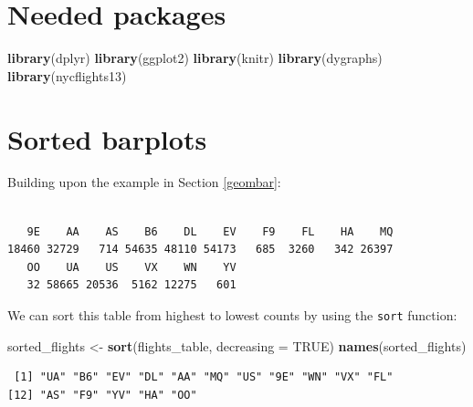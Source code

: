 \documentclass[12pt, krantz2,]{krantz}
\makeatletter
\newenvironment{Shaded}{\begin{snugshade}}{\end{snugshade}}
\newcommand{\DataTypeTok}[1]{\textcolor[rgb]{0.27,0.27,0.27}{#1}}
\newcommand{\KeywordTok}[1]{\textcolor[rgb]{0.27,0.27,0.27}{\textbf{#1}}}
\newcommand{\NormalTok}[1]{#1}
\newcommand{\OperatorTok}[1]{\textcolor[rgb]{0.43,0.43,0.43}{\textbf{#1}}}
\newcommand{\OtherTok}[1]{\textcolor[rgb]{0.37,0.37,0.37}{#1}}
\newcommand{\StringTok}[1]{\textcolor[rgb]{0.5,0.5,0.5}{#1}}
\newenvironment{kframe}{%
\medskip{}
\setlength{\fboxsep}{.8em}
 \def\at@end@of@kframe{}%
 \ifinner\ifhmode%
  \def\at@end@of@kframe{\end{minipage}}%
  \begin{minipage}{\columnwidth}%
 \fi\fi%
 \def\FrameCommand##1{\hskip\@totalleftmargin \hskip-\fboxsep
 \colorbox{shadecolor}{##1}\hskip-\fboxsep
     \hskip-\linewidth \hskip-\@totalleftmargin \hskip\columnwidth}%
 \MakeFramed {\advance\hsize-\width
   \@totalleftmargin\z@ \linewidth\hsize
   \@setminipage}}%
 {\par\unskip\endMakeFramed%
 \at@end@of@kframe}
\renewenvironment{Shaded}{\begin{kframe}}{\end{kframe}}
\makeatother
\begin{document}
\hypertarget{needed-packages-11}{%
\section*{Needed packages}\label{needed-packages-11}}


\begin{Shaded}
\begin{Highlighting}[]
\KeywordTok{library}\NormalTok{(dplyr)}
\KeywordTok{library}\NormalTok{(ggplot2)}
\KeywordTok{library}\NormalTok{(knitr)}
\KeywordTok{library}\NormalTok{(dygraphs)}
\KeywordTok{library}\NormalTok{(nycflights13)}
\end{Highlighting}
\end{Shaded}

\hypertarget{sorted-barplots}{%
\section{Sorted barplots}\label{sorted-barplots}}

Building upon the example in Section \ref{geombar}:

\begin{Shaded}
\end{Shaded}

\begin{verbatim}

   9E    AA    AS    B6    DL    EV    F9    FL    HA    MQ 
18460 32729   714 54635 48110 54173   685  3260   342 26397 
   OO    UA    US    VX    WN    YV 
   32 58665 20536  5162 12275   601 
\end{verbatim}

We can sort this table from highest to lowest counts by using the \texttt{sort} function:

\begin{Shaded}
\begin{Highlighting}[]
\NormalTok{sorted_flights <-}\StringTok{ }\KeywordTok{sort}\NormalTok{(flights_table, }\DataTypeTok{decreasing =} \OtherTok{TRUE}\NormalTok{)}
\KeywordTok{names}\NormalTok{(sorted_flights)}
\end{Highlighting}
\end{Shaded}

\begin{verbatim}
 [1] "UA" "B6" "EV" "DL" "AA" "MQ" "US" "9E" "WN" "VX" "FL"
[12] "AS" "F9" "YV" "HA" "OO"
\end{verbatim}
\end{document}
